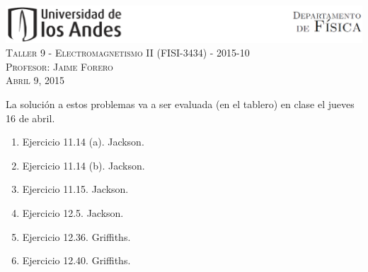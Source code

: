 \documentclass[letterpaper,10pt,onecolumn]{article}
\begin{document}
\begin{center}

\includegraphics[width=490pt]{header.png}\\[0.5cm]

\textsc{\LARGE Taller 9 - Electromagnetismo II (FISI-3434) - 2015-10}\\[0.5cm]

\textsc{\Large{Profesor: Jaime Forero}} \\[0.5cm]

\textsc{Abril 9, 2015} \\[0.5cm]

\end{center}

La soluci\'on a estos problemas va a ser evaluada (en el tablero) en
clase el jueves 16 de abril.

\begin{enumerate}
\item Ejercicio 11.14 (a). Jackson.
\item Ejercicio 11.14 (b). Jackson.
\item Ejercicio 11.15. Jackson.
\item Ejercicio 12.5. Jackson.
\item Ejercicio 12.36. Griffiths.
\item Ejercicio 12.40. Griffiths.
\end{enumerate}
\end{document}
